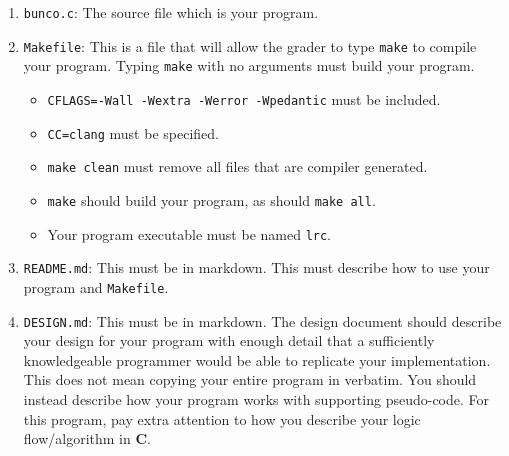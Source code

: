 \documentclass{article}
\begin{document}
\begin{enumerate}
\item \texttt{bunco.c}: The source file which is your program.

\item \texttt{Makefile}: This is a file that will allow the grader to type
    \texttt{make} to compile your program. Typing \texttt{make} with no
    arguments must build your program.
\begin{itemize}
\item \texttt{CFLAGS=-Wall -Wextra -Werror -Wpedantic} must be included.
\item \texttt{CC=clang} must be specified.
\item \texttt{make clean} must remove all files that are compiler generated.
\item \texttt{make} should build your program, as should \texttt{make all}.
\item Your program executable must be named \texttt{lrc}.
\end{itemize}

\item \texttt{README.md}: This must be in markdown.
This must describe how to use your program and \texttt{Makefile}.

\item \texttt{DESIGN.md}: This must be in markdown. The design document
should describe your design for your program with enough detail
that a sufficiently knowledgeable programmer would be able to
replicate your implementation. This does not mean copying your
entire program in verbatim. You should instead describe how your
program works with supporting pseudo-code. For this program, pay
extra attention to how you describe your logic flow/algorithm in
\textbf{C}.

\end{enumerate}




\end{document}
